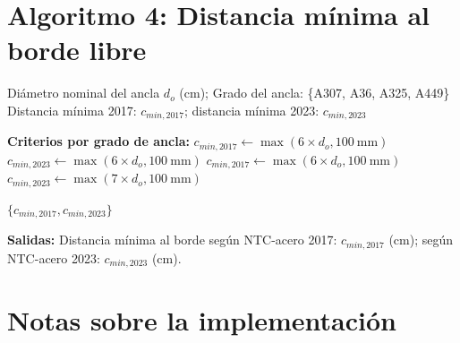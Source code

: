 \section{Algoritmo 4: Distancia mínima al borde libre}

\begin{algorithm}[H]
  \caption{\textbf{distancia\_mínima\_borde}$(d_o, \text{grado\_ancla})$}
  \label{alg:borde}
  \begin{algorithmic}[1]
    \Require Diámetro nominal del ancla $d_o$ (cm);
             Grado del ancla: \{A307, A36, A325, A449\}
    \Ensure Distancia mínima 2017: $c_{min,2017}$;
            distancia mínima 2023: $c_{min,2023}$

    \State \textbf{Criterios por grado de ancla:}
      \State $c_{min,2017} \gets \max(6 \times d_o, 100~\text{mm})$
      \State $c_{min,2023} \gets \max(6 \times d_o, 100~\text{mm})$ \quad {}
      \State $c_{min,2017} \gets \max(6 \times d_o, 100~\text{mm})$
      \State $c_{min,2023} \gets \max(7 \times d_o, 100~\text{mm})$ \quad {}
    \EndIf

    \Return $\{c_{min,2017}, c_{min,2023}\}$
  \end{algorithmic}
\end{algorithm}

\textbf{Salidas:} Distancia mínima al borde según NTC-acero 2017: $c_{min,2017}$ (cm);
según NTC-acero 2023: $c_{min,2023}$ (cm).

\section*{Notas sobre la implementación}

